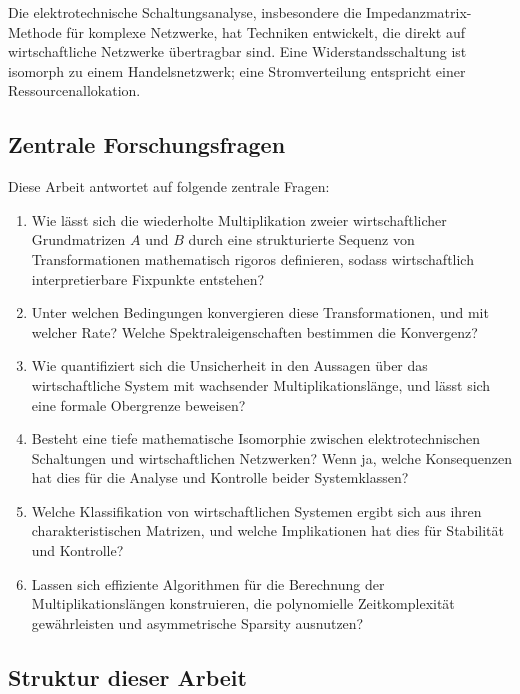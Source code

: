 \documentclass[a4paper,12pt]{article}
\theoremstyle{definition}
\begin{document}
Die elektrotechnische Schaltungsanalyse, insbesondere die Impedanzmatrix-Methode für komplexe Netzwerke, hat Techniken entwickelt, die direkt auf wirtschaftliche Netzwerke übertragbar sind. Eine Widerstandsschaltung ist isomorph zu einem Handelsnetzwerk; eine Stromverteilung entspricht einer Ressourcenallokation.

\subsection{Zentrale Forschungsfragen}

Diese Arbeit antwortet auf folgende zentrale Fragen:

\begin{enumerate}
\item Wie lässt sich die wiederholte Multiplikation zweier wirtschaftlicher Grundmatrizen $A$ und $B$ durch eine strukturierte Sequenz von Transformationen mathematisch rigoros definieren, sodass wirtschaftlich interpretierbare Fixpunkte entstehen?

\item Unter welchen Bedingungen konvergieren diese Transformationen, und mit welcher Rate? Welche Spektraleigenschaften bestimmen die Konvergenz?

\item Wie quantifiziert sich die Unsicherheit in den Aussagen über das wirtschaftliche System mit wachsender Multiplikationslänge, und lässt sich eine formale Obergrenze beweisen?

\item Besteht eine tiefe mathematische Isomorphie zwischen elektrotechnischen Schaltungen und wirtschaftlichen Netzwerken? Wenn ja, welche Konsequenzen hat dies für die Analyse und Kontrolle beider Systemklassen?

\item Welche Klassifikation von wirtschaftlichen Systemen ergibt sich aus ihren charakteristischen Matrizen, und welche Implikationen hat dies für Stabilität und Kontrolle?

\item Lassen sich effiziente Algorithmen für die Berechnung der Multiplikationslängen konstruieren, die polynomielle Zeitkomplexität gewährleisten und asymmetrische Sparsity ausnutzen?
\end{enumerate}

\subsection{Struktur dieser Arbeit}
\end{document}
